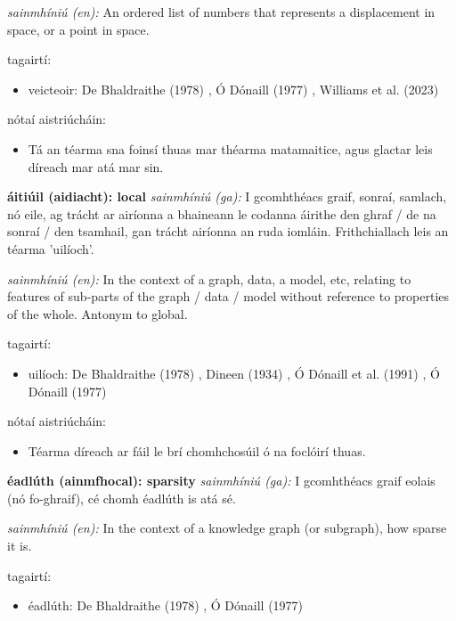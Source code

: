 \documentclass{article}
\begin{document}
\textit{sainmhíniú (en):} An ordered list of numbers that represents a displacement in space, or a point in space.

tagairtí:
\begin{itemize}
	\item veicteoir: De Bhaldraithe (1978) \cite{de-bhaldraithe}, Ó Dónaill (1977) \cite{odonaill}, Williams et al. (2023) \cite{storchiste}
\end{itemize}

nótaí aistriúcháin:
\begin{itemize}
	\item Tá an téarma sna foinsí thuas mar théarma matamaitice, agus glactar leis díreach mar atá mar sin.
\end{itemize}


\textbf{áitiúil (aidiacht): local}
\textit{sainmhíniú (ga):} I gcomhthéacs graif, sonraí, samlach, nó eile, ag trácht ar airíonna a bhaineann le codanna áirithe den ghraf / de na sonraí / den tsamhail, gan trácht airíonna an ruda iomláin. Frithchiallach leis an téarma 'uilíoch'.

\textit{sainmhíniú (en):} In the context of a graph, data, a model, etc, relating to features of sub-parts of the graph / data / model without reference to properties of the whole. Antonym to global.

tagairtí:
\begin{itemize}
	\item uilíoch: De Bhaldraithe (1978) \cite{de-bhaldraithe}, Dineen (1934) \cite{dineen}, Ó Dónaill et al. (1991) \cite{focloir-beag}, Ó Dónaill (1977) \cite{odonaill}
\end{itemize}

nótaí aistriúcháin:
\begin{itemize}
	\item Téarma díreach ar fáil le brí chomhchosúil ó na foclóirí thuas.
\end{itemize}


\textbf{éadlúth (ainmfhocal): sparsity}
\textit{sainmhíniú (ga):} I gcomhthéacs graif eolais (nó fo-ghraif), cé chomh éadlúth is atá sé.

\textit{sainmhíniú (en):} In the context of a knowledge graph (or subgraph), how sparse it is.

tagairtí:
\begin{itemize}
	\item éadlúth: De Bhaldraithe (1978) \cite{de-bhaldraithe}, Ó Dónaill (1977) \cite{odonaill}
\end{itemize}
\end{document}
